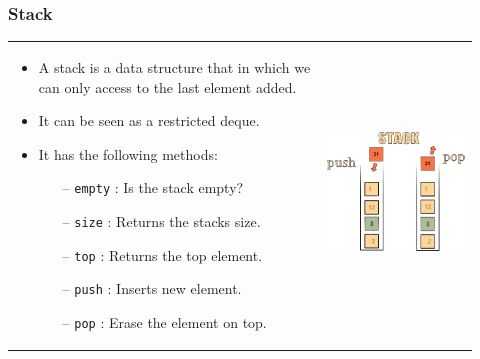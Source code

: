 \documentclass{beamer}
\begin{document}
\begin{frame}
    \frametitle{Stack}
    
    \begin{tabularx}{\linewidth}{m{0.62\linewidth}  m{0.3\linewidth}}
        \begin{itemize}
            \item A stack is a data structure that in which we can only access to the last element added.
            \item It can be seen as a restricted deque.
            \item It has the following methods:
                \begin{itemize}
                    \item[--] \texttt{empty} : Is the stack empty?
                    \item[--] \texttt{size} : Returns the stacks size.
                    \item[--] \texttt{top} : Returns the top element.
                    \item[--] \texttt{push} : Inserts new element.
                    \item[--] \texttt{pop} : Erase the element on top.
                \end{itemize}
        \end{itemize}

        &

        \includegraphics[scale=0.25]{images/stack}
    \end{tabularx}

\end{frame}
\end{document}

